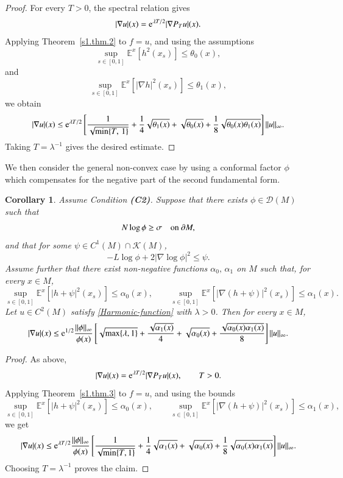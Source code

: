 \documentclass[11pt,twoside, reqno]{article}
\def\e{{\rm e}}
\newcommand\1{\mathbbm{1}}
\newtheorem{corollary}[theorem]{Corollary}
\theoremstyle{definition}
\numberwithin{equation}{section}
\def \e{{\rm e}}
\begin{document}
\begin{proof}
For every \(T>0\), the spectral relation gives
\[
        |\nabla u|(x)=\e^{\lambda T/2}|\nabla P_Tu|(x).
\]
Applying Theorem~\ref{s1.thm.2} to \(f=u\), and using the
assumptions
\[
        \sup_{s\in [0,1] }\mathbb E^x[h^2(x_s)]
        \leq  {\theta}_0(x),
\]
and
\[
        \sup_{s\in[0,1] }\mathbb E^x[|\nabla h|^2(x_s)]
        \leq  {\theta}_1(x),
\]
we obtain
\[
        |\nabla u|(x)
        \leq
        \e^{\lambda T/2}
        \left[
        \frac1{\sqrt {\min\{T,\, 1\}}}
        +
        \frac14\sqrt{ {\theta}_1(x)}
        +
        \sqrt{ {\theta}_0(x)}
        +
        \frac{1}{8}
        \sqrt{ {\theta}_0(x) {\theta}_1(x)}
        \right]
        \|u\|_{\infty}.
\]
Taking \(T=\lambda^{-1}\) gives the desired estimate.
\end{proof}

We then consider the general
non-convex case by using a conformal factor \(\phi\) which compensates for the
negative part of the second fundamental form. 


\begin{corollary}
\label{cor:neumann-eigen-nonconvex}
Assume Condition {\bf(C2)}. Suppose that there exists
\(\phi\in \mathcal{D}(M)\) such that
\[
        N\log\phi\geq \sigma
        \quad \hbox{on } \partial M,
\]
and that for some \(\psi\in C^1(M)\cap \mathcal K(M)\),
\[
        -L\log\phi+2|\nabla\log\phi|^2\leq \psi.
\]
Assume further that there exist non-negative functions \( \alpha_0,\, \alpha_1\)
on \(M\) such that, for every \(x\in M\),
\[
        \sup_{s\in [0,1]}\mathbb E^x[|h+\psi|^2(x_s)]
        \leq  {\alpha}_0(x),
        \qquad
        \sup_{s\in [0,1] }
        \mathbb E^x[|\nabla(h+\psi)|^2(x_s)]
        \leq  {\alpha}_1(x).
\]
Let \(u\in C^2(M)\) satisfy \eqref{Harmonic-function} with \(\lambda>0\). Then for every \(x\in M\),
\[
        |\nabla u|(x)
        \leq
        \e^{1/2}
        \frac{\|\phi\|_{\infty}}{\phi(x)}
        \left[
        \sqrt{\max\{\lambda,  1\} }
        +
        \frac{\sqrt{ {\alpha}_1(x)}}{4}
        +
       \sqrt{ {\alpha}_0(x)}
        +
        \frac{\sqrt{ {\alpha}_0(x) {\alpha}_1(x)}}{8}
        \right]
        \|u\|_{\infty}.
\]
\end{corollary}

\begin{proof}
As above,
\[
        |\nabla u|(x)=\e^{\lambda T/2}|\nabla P_Tu|(x),
        \qquad T>0.
\]
Applying Theorem~\ref{s1.thm.3} to \(f=u\), and using
the  bounds
\[
        \sup_{s\in[0,1]}\mathbb E^x[|h+\psi|^2(x_s)]
        \leq  {\alpha}_0(x),
        \qquad
        \sup_{s\in[0,1]}
        \mathbb E^x[|\nabla(h+\psi)|^2(x_s)]
        \leq {\alpha}_1(x),
\]
we get
\[
        |\nabla u|(x)
        \leq
        \e^{\lambda T/2}
        \frac{\|\phi\|_{\infty}}{\phi(x)}
        \left[
        \frac1{\sqrt {\min\{T,  1\}}}
        +
        \frac14\sqrt{ {\alpha}_1(x)}
        +
        \sqrt{ {\alpha}_0(x)}
        +
        \frac{1}{8}
        \sqrt{ {\alpha}_0(x) {\alpha}_1(x)}
        \right]
        \|u\|_{\infty}.
\]
Choosing \(T=\lambda^{-1}\) proves the claim.
\end{proof}
\end{document}
